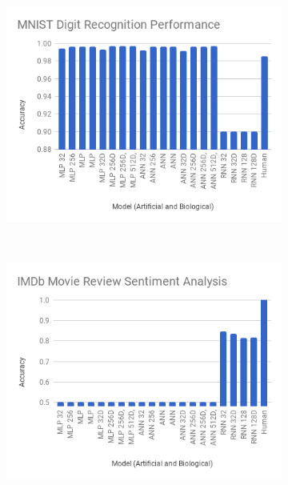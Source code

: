 \documentclass[]{report}
\begin{document}
\begin{figure}[H]
	\centering
	\begin{subfigure}[b]{0.45\textwidth}
		\includegraphics[width=\textwidth]{chart2.png}
	\end{subfigure}
	~
	\begin{subfigure}[b]{0.45\textwidth}
		\includegraphics[width=\textwidth]{chart3.png}
	\end{subfigure}
	~
	\begin{subfigure}[b]{0.45\textwidth}

\end{subfigure}
\end{figure}
\end{document}

